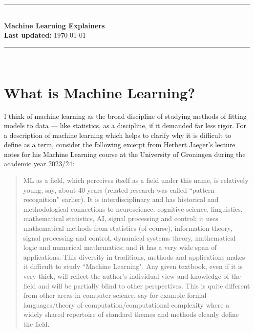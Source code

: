 \documentclass[11pt]{article}
\begin{document}
\begin{center}
\hspace*{\fill}\rule{0.95\linewidth}{0.1pt}\hspace*{\fill}\\[0.6cm]
{\huge\bfseries Machine Learning Explainers}\\[0.2cm]
\textbf{Last updated:} \today\\
\hspace*{\fill}\rule{0.95\linewidth}{0.1pt}\hspace*{\fill}\\[0.6cm]
\end{center}

\begin{abstract}
    \noindent Summaries of some machine/deep learning-related topics. My main motive in writing these summaries is as a reminder for my future self.
\end{abstract}

\setcounter{tocdepth}{2}{\scriptsize\tableofcontents}

\thispagestyle{empty}
\setcounter{page}{0}
\newpage

\section{What is Machine Learning?}
I think of machine learning as the broad discipline of studying methods of fitting models to data — like statistics, as a discipline, if it demanded far less rigor. For a description of machine learning which helps to clarify why it is difficult to define as a term, consider the following excerpt from Herbert Jaeger's lecture notes for his Machine Learning course at the University of Groningen during the academic year 2023/24:
\begin{quotation}
    ML as a ﬁeld, which perceives itself as a ﬁeld under this name, is relatively young, say, about 40 years (related research was called “pattern recognition” earlier). It is interdisciplinary and has historical and methodological connections to neuroscience, cognitive science, linguistics, mathematical statistics, AI, signal processing and control; it uses mathematical methods from statistics (of course), information theory, signal processing and control, dynamical systems theory, mathematical logic and numerical mathematics; and it has a very wide span of applications. This diversity in traditions, methods and applications makes it diﬃcult to study ``Machine Learning". Any given textbook, even if it is very thick, will reﬂect the author's individual view and knowledge of the ﬁeld and will be partially blind to other perspectives. This is quite diﬀerent from other areas in computer science, say for example formal languages/theory of computation/computational complexity where a widely shared repertoire of standard themes and methods cleanly deﬁne the ﬁeld.
\end{quotation}
\end{document}
